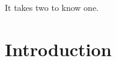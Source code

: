 
\begin{savequote}[8cm]

  It takes two to know one.


\end{savequote}









\chapter{\label{chap:intro}Introduction}



\minitoc





